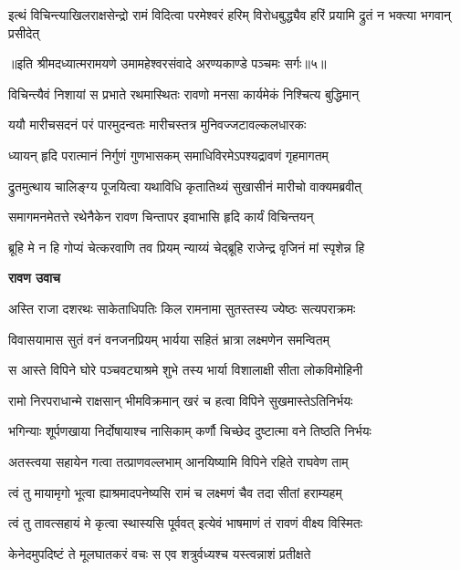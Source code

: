 \fourlineindentedshloka
{इत्थं विचिन्त्याखिलराक्षसेन्द्रो}
{रामं विदित्वा परमेश्वरं हरिम्}
{विरोधबुद्ध्यैव हरिं प्रयामि}
{द्रुतं न भक्त्या भगवान् प्रसीदेत्} %

{॥इति श्रीमदध्यात्मरामयणे उमामहेश्वरसंवादे
अरण्यकाण्डे पञ्चमः सर्गः॥५॥
}




\twolineshloka
{विचिन्त्यैवं निशायां स प्रभाते रथमास्थितः}
{रावणो मनसा कार्यमेकं निश्चित्य बुद्धिमान्} %

\twolineshloka
{ययौ मारीचसदनं परं पारमुदन्वतः}
{मारीचस्तत्र मुनिवज्जटावल्कलधारकः} %

\twolineshloka
{ध्यायन् हृदि परात्मानं निर्गुणं गुणभासकम्}
{समाधिविरमेऽपश्यद्रावणं गृहमागतम्} %

\twolineshloka
{द्रुतमुत्थाय चालिङ्ग्य पूजयित्वा यथाविधि}
{कृतातिथ्यं सुखासीनं मारीचो वाक्यमब्रवीत्} %

\twolineshloka
{समागमनमेतत्ते रथेनैकेन रावण}
{चिन्तापर इवाभासि हृदि कार्यं विचिन्तयन्} %

\twolineshloka
{ब्रूहि मे न हि गोप्यं चेत्करवाणि तव प्रियम्}
{न्याय्यं चेद्ब्रूहि राजेन्द्र वृजिनं मां स्पृशेन्न हि} %

\textbf{रावण उवाच}

\twolineshloka
{अस्ति राजा दशरथः साकेताधिपतिः किल}
{रामनामा सुतस्तस्य ज्येष्ठः सत्यपराक्रमः} %

\twolineshloka
{विवासयामास सुतं वनं वनजनप्रियम्}
{भार्यया सहितं भ्रात्रा लक्ष्मणेन समन्वितम्} %

\twolineshloka
{स आस्ते विपिने घोरे पञ्चवट्याश्रमे शुभे}
{तस्य भार्या विशालाक्षी सीता लोकविमोहिनी} %

\twolineshloka
{रामो निरपराधान्मे राक्षसान् भीमविक्रमान्}
{खरं च हत्वा विपिने सुखमास्तेऽतिनिर्भयः} %

\twolineshloka
{भगिन्याः शूर्पणखाया निर्दोषायाश्च नासिकाम्}
{कर्णौ चिच्छेद दुष्टात्मा वने तिष्ठति निर्भयः} %

\twolineshloka
{अतस्त्वया सहायेन गत्वा तत्प्राणवल्लभाम्}
{आनयिष्यामि विपिने रहिते राघवेण ताम्} %

\twolineshloka
{त्वं तु मायामृगो भूत्वा ह्याश्रमादपनेष्यसि}
{रामं च लक्ष्मणं चैव तदा सीतां हराम्यहम्} %

\twolineshloka
{त्वं तु तावत्सहायं मे कृत्वा स्थास्यसि पूर्ववत्}
{इत्येवं भाषमाणं तं रावणं वीक्ष्य विस्मितः} %

\twolineshloka
{केनेदमुपदिष्टं ते मूलघातकरं वचः}
{स एव शत्रुर्वध्यश्च यस्त्वन्नाशं प्रतीक्षते} %

